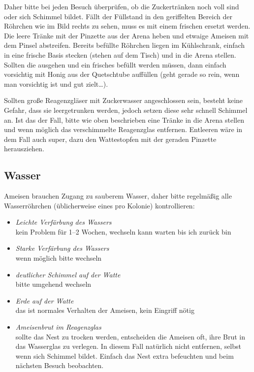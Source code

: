 Daher bitte bei jeden Besuch überprüfen, ob die Zuckertränken noch voll sind oder sich Schimmel bildet.
Fällt der Füllstand in den geriffelten Bereich der Röhrchen wie im Bild rechts zu sehen,
muss es mit einem frischen ersetzt werden.
Die leere Tränke mit der Pinzette aus der Arena heben und etwaige Ameisen mit dem Pinsel abstreifen.
Bereits befüllte Röhrchen liegen im Kühlschrank, einfach in eine frische Basis stecken (stehen auf dem Tisch)
und in die Arena stellen.
Sollten die ausgehen und ein frisches befüllt werden müssen, dann einfach vorsichtig mit Honig aus der Quetschtube auffüllen
(geht gerade so rein, wenn man vorsichtig ist und gut zielt\ldots{}).

Sollten große Reagenzgläser mit Zuckerwasser angeschlossen sein, besteht keine Gefahr,
dass sie leergetrunken werden, jedoch setzen diese sehr schnell Schimmel an.
Ist das der Fall, bitte wie oben beschrieben eine Tränke in die Arena stellen und
wenn möglich das verschimmelte Reagenzglas entfernen.
Entleeren wäre in dem Fall auch super, dazu den Wattestopfen mit der geraden Pinzette herausziehen.

\subsection{Wasser}\label{sec:Ameisen_sub:Wasser}
Ameisen brauchen Zugang zu sauberem Wasser, daher bitte regelmäßig alle Wasserröhrchen
(üblicherweise eines pro Kolonie) kontrollieren:

\begin{itemize}
  \item\textit{Leichte Verfärbung des Wassers} \\
  kein Problem für 1--2 Wochen, wechseln kann warten bis ich zurück bin
  \item\textit{Starke Verfärbung des Wassers} \\
  wenn möglich bitte wechseln
  \item\textit{deutlicher Schimmel auf der Watte} \\
  bitte umgehend wechseln
  \item\textit{Erde auf der Watte} \\
  das ist normales Verhalten der Ameisen, kein Eingriff nötig
  \item\textit{Ameisenbrut im Reagenzglas} \\
  sollte das Nest zu trocken werden, entscheiden die Ameisen oft, ihre Brut in das Wasserglas zu verlegen.
  In diesem Fall natürlich nicht entfernen, selbst wenn sich Schimmel bildet.
  Einfach das Nest extra befeuchten und beim nächsten Besuch beobachten.
\end{itemize}

